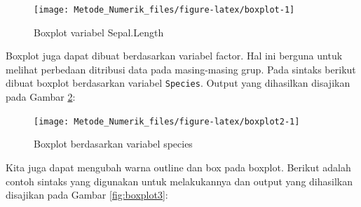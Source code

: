 \documentclass[
]{book}
\newenvironment{Shaded}{\begin{snugshade}}{\end{snugshade}}
\newcommand{\AttributeTok}[1]{\textcolor[rgb]{0.13,0.29,0.53}{#1}}
\newcommand{\CommentTok}[1]{\textcolor[rgb]{0.56,0.35,0.01}{\textit{#1}}}
\newcommand{\FunctionTok}[1]{\textcolor[rgb]{0.13,0.29,0.53}{\textbf{#1}}}
\newcommand{\NormalTok}[1]{#1}
\newcommand{\SpecialCharTok}[1]{\textcolor[rgb]{0.81,0.36,0.00}{\textbf{#1}}}
\newcommand{\StringTok}[1]{\textcolor[rgb]{0.31,0.60,0.02}{#1}}
\theoremstyle{definition}
\theoremstyle{definition}
\theoremstyle{definition}
\theoremstyle{definition}
\theoremstyle{remark}
\begin{document}
\begin{Shaded}
\end{Shaded}

\begin{figure}

{\centering \texttt{[image: Metode\_Numerik\_files/figure-latex/boxplot-1]} 

}

\caption{Boxplot variabel Sepal.Length}\label{fig:boxplot}
\end{figure}

Boxplot juga dapat dibuat berdasarkan variabel factor. Hal ini berguna untuk melihat perbedaan ditribusi data pada masing-masing grup. Pada sintaks berikut dibuat boxplot berdasarkan variabel \texttt{Species}. Output yang dihasilkan disajikan pada Gambar \ref{fig:boxplot2}:

\begin{Shaded}
\end{Shaded}

\begin{figure}

{\centering \texttt{[image: Metode\_Numerik\_files/figure-latex/boxplot2-1]} 

}

\caption{Boxplot berdasarkan variabel species}\label{fig:boxplot2}
\end{figure}

Kita juga dapat mengubah warna outline dan box pada boxplot. Berikut adalah contoh sintaks yang digunakan untuk melakukannya dan output yang dihasilkan disajikan pada Gambar \ref{fig:boxplot3}:

\begin{Shaded}
\end{Shaded}
\end{document}
